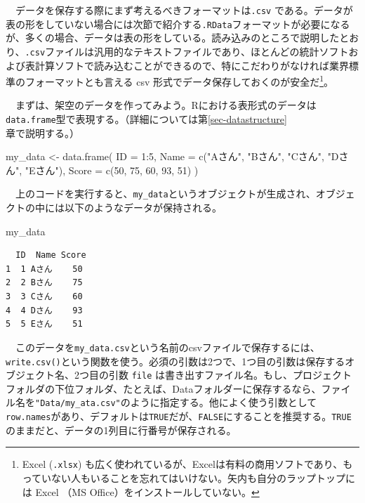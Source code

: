 \documentclass[
  a4paper,
  pandoc,
  ja=standard,
  jafont=haranoaji]{bxjsbook}
\newenvironment{Shaded}{\begin{snugshade}}{\end{snugshade}}
\newcommand{\AttributeTok}[1]{\textcolor[rgb]{0.00,0.48,0.65}{#1}}
\newcommand{\DecValTok}[1]{\textcolor[rgb]{0.68,0.00,0.00}{#1}}
\newcommand{\FunctionTok}[1]{\textcolor[rgb]{0.28,0.35,0.67}{#1}}
\newcommand{\NormalTok}[1]{\textcolor[rgb]{0.00,0.48,0.65}{#1}}
\newcommand{\OtherTok}[1]{\textcolor[rgb]{0.00,0.48,0.65}{#1}}
\newcommand{\SpecialCharTok}[1]{\textcolor[rgb]{0.37,0.37,0.37}{#1}}
\newcommand{\StringTok}[1]{\textcolor[rgb]{0.13,0.47,0.30}{#1}}
\begin{document}
　データを保存する際にまず考えるべきフォーマットは\texttt{.csv}
である。データが表の形をしていない場合には次節で紹介する\texttt{.RData}フォーマットが必要になるが、多くの場合、データは表の形をしている。読み込みのところで説明したとおり、\texttt{.csv}ファイルは汎用的なテキストファイルであり、ほとんどの統計ソフトおよび表計算ソフトで読み込むことができるので、特にこだわりがなければ業界標準のフォーマットとも言える
csv 形式でデータ保存しておくのが安全だ\footnote{Excel (\texttt{.xlsx})
  も広く使われているが、Excelは有料の商用ソフトであり、もっていない人もいることを忘れてはいけない。矢内も自分のラップトップには
  Excel （MS Office）をインストールしていない。}。

　まずは、架空のデータを作ってみよう。Rにおける表形式のデータは
\texttt{data.frame}型で表現する。（詳細については第\ref{sec-datastructure}章で説明する。）

\begin{Shaded}
\begin{Highlighting}[numbers=left,,]
\NormalTok{my\_data }\OtherTok{\textless{}{-}} \FunctionTok{data.frame}\NormalTok{(}
    \AttributeTok{ID    =} \DecValTok{1}\SpecialCharTok{:}\DecValTok{5}\NormalTok{,}
    \AttributeTok{Name  =} \FunctionTok{c}\NormalTok{(}\StringTok{"Aさん"}\NormalTok{, }\StringTok{"Bさん"}\NormalTok{, }\StringTok{"Cさん"}\NormalTok{, }\StringTok{"Dさん"}\NormalTok{, }\StringTok{"Eさん"}\NormalTok{),}
    \AttributeTok{Score =} \FunctionTok{c}\NormalTok{(}\DecValTok{50}\NormalTok{, }\DecValTok{75}\NormalTok{, }\DecValTok{60}\NormalTok{, }\DecValTok{93}\NormalTok{, }\DecValTok{51}\NormalTok{)}
\NormalTok{)}
\end{Highlighting}
\end{Shaded}

　上のコードを実行すると、\texttt{my\_data}というオブジェクトが生成され、オブジェクトの中には以下のようなデータが保持される。

\begin{Shaded}
\begin{Highlighting}[numbers=left,,]
\NormalTok{my\_data}
\end{Highlighting}
\end{Shaded}

\begin{verbatim}
  ID  Name Score
1  1 Aさん    50
2  2 Bさん    75
3  3 Cさん    60
4  4 Dさん    93
5  5 Eさん    51
\end{verbatim}

　このデータを\texttt{my\_data.csv}という名前のcsvファイルで保存するには、\texttt{write.csv()}という関数を使う。必須の引数は2つで、1つ目の引数は保存するオブジェクト名、2つ目の引数
\texttt{file}
は書き出すファイル名。もし、プロジェクトフォルダの下位フォルダ、たとえば、Dataフォルダーに保存するなら、ファイル名を\texttt{"Data/my\_ata.csv"}のように指定する。他によく使う引数として\texttt{row.names}があり、デフォルトは\texttt{TRUE}だが、\texttt{FALSE}にすることを推奨する。\texttt{TRUE}のままだと、データの1列目に行番号が保存される。
\end{document}
